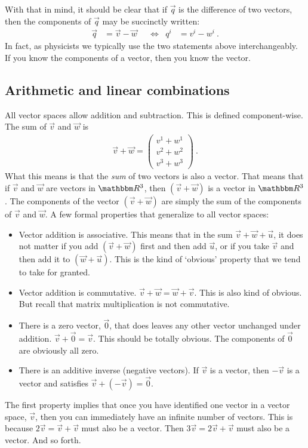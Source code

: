 \documentclass[12pt]{article}
\begin{document}
With that in mind, it should be clear that if $\vec{q}$ is the difference of two vectors, then the components of $\vec{q}$ may be succinctly written:
\begin{align}
\vec{q} &= \vec{v}-\vec{w}    
&
&\Leftrightarrow
&
q^i &= v^i - w^i \ .
\end{align}
In fact, as physicists we typically use the two statements above interchangeably. If you know the components of a vector, then you know the vector.



\subsection{Arithmetic and linear combinations}

All vector spaces allow addition and subtraction. This is defined component-wise. The sum of $\vec{v}$ and $\vec{w}$ is
\begin{align}
    \vec{v}+\vec{w} = 
    \begin{pmatrix}
        v^1 + w^1\\
        v^2 + w^2\\
        v^3 + w^3
    \end{pmatrix} \ .
\end{align}
What this means is that the \emph{sum} of two vectors is also a vector. That means that if $\vec{v}$ and $\vec{w}$ are vectors in $\RR ^3$, then $(\vec{v}+\vec{w})$ is a vector in $\RR ^3$. The components of the vector $(\vec{v}+\vec{w})$ are simply the sum of the components of $\vec{v}$ and $\vec{w}$. 
% 
A few formal properties that generalize to all vector spaces:
\begin{itemize}
    \item Vector addition is associative. This means that in the sum $\vec{v}+\vec{w}+\vec{u}$, it does not matter if you add $(\vec{v}+\vec{w})$ first and then add $\vec{u}$, or if you take $\vec{v}$ and then add it to $(\vec{w}+\vec{u})$. This is the kind of `obvious' property that we tend to take for granted.
    \item Vector addition is commutative. $\vec{v}+\vec{w} = \vec{w}+\vec{v}$. This is also kind of obvious. But recall that matrix multiplication is not commutative.
    \item There is a zero vector, $\vec{0}$, that does leaves any other vector unchanged under addition. $\vec{v}+\vec{0} = \vec{v}$. This should be totally obvious. The components of $\vec{0}$ are obviously all zero.
    \item There is an additive inverse (negative vectors). If $\vec{v}$ is a vector, then $-\vec{v}$ is a vector and satisfies $\vec{v}+(-\vec{v}) = \vec{0}$.
\end{itemize}
\begin{example}
The first property implies that once you have identified one vector in a vector space, $\vec{v}$, then you can immediately have an infinite number of vectors. This is because $2\vec{v} = \vec{v}+\vec{v}$ must also be a vector. Then $3\vec{v} = 2\vec{v}+\vec{v}$ must also be a vector. And so forth.
\end{example}
\end{document}
